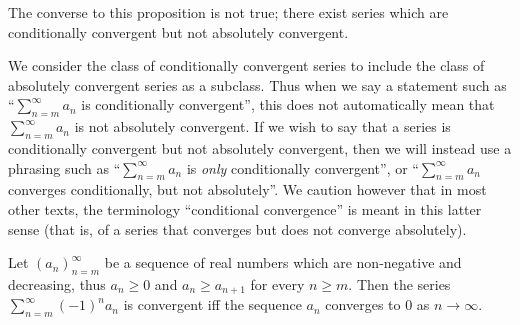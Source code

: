 \begin{rmk}\label{7.2.10}
  The converse to this proposition is not true;
  there exist series which are conditionally convergent but not absolutely convergent.
\end{rmk}

\begin{rmk}\label{7.2.11}
  We consider the class of conditionally convergent series to include the class of absolutely convergent series as a subclass.
  Thus when we say a statement such as ``\(\sum_{n = m}^\infty a_n\) is conditionally convergent'', this does not automatically mean that \(\sum_{n = m}^\infty a_n\) is not absolutely convergent.
  If we wish to say that a series is conditionally convergent but not absolutely convergent, then we will instead use a phrasing such as ``\(\sum_{n = m}^\infty a_n\) is \emph{only} conditionally convergent'', or ``\(\sum_{n = m}^\infty a_n\) converges conditionally, but not absolutely''.
  We caution however that in most other texts, the terminology ``conditional convergence'' is meant in this latter sense
  (that is, of a series that converges but does not converge absolutely).
\end{rmk}

\begin{prop}\label{7.2.12}
  Let \((a_n)_{n = m}^\infty\) be a sequence of real numbers which are non-negative and decreasing, thus \(a_n \geq 0\) and \(a_n \geq a_{n + 1}\) for every \(n \geq m\).
  Then the series \(\sum_{n = m}^\infty (-1)^n a_n\) is convergent iff the sequence \(a_n\) converges to \(0\) as \(n \to \infty\).
\end{prop}

